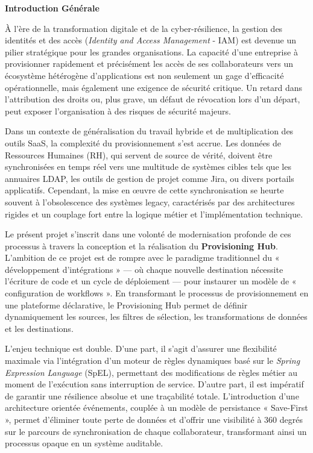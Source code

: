 \begin{center}
    {\fontsize{24}{28}\selectfont \textbf{Introduction Générale}}
\end{center}
\label{chap:intro_gen}
\vspace{1cm}

À l'ère de la transformation digitale et de la cyber-résilience, la gestion des identités et des accès (\textit{Identity and Access Management} - IAM) est devenue un pilier stratégique pour les grandes organisations. La capacité d'une entreprise à provisionner rapidement et précisément les accès de ses collaborateurs vers un écosystème hétérogène d'applications est non seulement un gage d'efficacité opérationnelle, mais également une exigence de sécurité critique. Un retard dans l'attribution des droits ou, plus grave, un défaut de révocation lors d'un départ, peut exposer l'organisation à des risques de sécurité majeurs.

Dans un contexte de généralisation du travail hybride et de multiplication des outils SaaS, la complexité du provisionnement s'est accrue. Les données de Ressources Humaines (RH), qui servent de source de vérité, doivent être synchronisées en temps réel vers une multitude de systèmes cibles tels que les annuaires LDAP, les outils de gestion de projet comme Jira, ou divers portails applicatifs. Cependant, la mise en œuvre de cette synchronisation se heurte souvent à l'obsolescence des systèmes legacy, caractérisés par des architectures rigides et un couplage fort entre la logique métier et l'implémentation technique.

Le présent projet s'inscrit dans une volonté de modernisation profonde de ces processus à travers la conception et la réalisation du \textbf{Provisioning Hub}. L'ambition de ce projet est de rompre avec le paradigme traditionnel du « développement d'intégrations » — où chaque nouvelle destination nécessite l'écriture de code et un cycle de déploiement — pour instaurer un modèle de « configuration de workflows ». En transformant le processus de provisionnement en une plateforme déclarative, le Provisioning Hub permet de définir dynamiquement les sources, les filtres de sélection, les transformations de données et les destinations.

L'enjeu technique est double. D'une part, il s'agit d'assurer une flexibilité maximale via l'intégration d'un moteur de règles dynamiques basé sur le \textit{Spring Expression Language} (SpEL), permettant des modifications de règles métier au moment de l'exécution sans interruption de service. D'autre part, il est impératif de garantir une résilience absolue et une traçabilité totale. L'introduction d'une architecture orientée événements, couplée à un modèle de persistance « Save-First », permet d'éliminer toute perte de données et d'offrir une visibilité à 360 degrés sur le parcours de synchronisation de chaque collaborateur, transformant ainsi un processus opaque en un système auditable.

